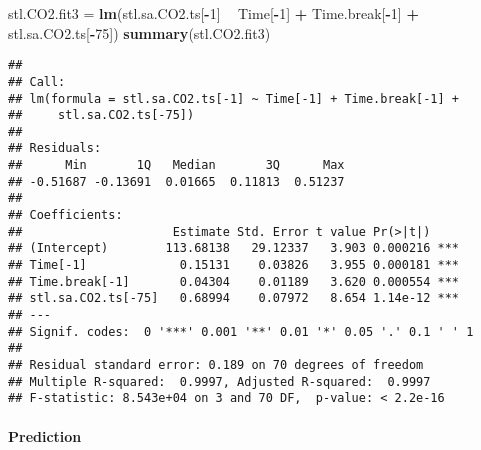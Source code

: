 \documentclass[]{article}
\newenvironment{Shaded}{\begin{snugshade}}{\end{snugshade}}
\newcommand{\DecValTok}[1]{\textcolor[rgb]{0.00,0.00,0.81}{#1}}
\newcommand{\KeywordTok}[1]{\textcolor[rgb]{0.13,0.29,0.53}{\textbf{#1}}}
\newcommand{\NormalTok}[1]{#1}
\newcommand{\OperatorTok}[1]{\textcolor[rgb]{0.81,0.36,0.00}{\textbf{#1}}}
\newcommand{\StringTok}[1]{\textcolor[rgb]{0.31,0.60,0.02}{#1}}
\let\oldparagraph\paragraph
\renewcommand{\paragraph}[1]{\oldparagraph{#1}\mbox{}}
\begin{document}
\begin{Shaded}
\begin{Highlighting}[]
\NormalTok{stl.CO2.fit3 =}\StringTok{ }\KeywordTok{lm}\NormalTok{(stl.sa.CO2.ts[}\OperatorTok{-}\DecValTok{1}\NormalTok{] }\OperatorTok{~}\StringTok{ }\NormalTok{Time[}\OperatorTok{-}\DecValTok{1}\NormalTok{] }\OperatorTok{+}\StringTok{ }\NormalTok{Time.break[}\OperatorTok{-}\DecValTok{1}\NormalTok{] }\OperatorTok{+}\StringTok{ }\NormalTok{stl.sa.CO2.ts[}\OperatorTok{-}\DecValTok{75}\NormalTok{])}
\KeywordTok{summary}\NormalTok{(stl.CO2.fit3)}
\end{Highlighting}
\end{Shaded}

\begin{verbatim}
## 
## Call:
## lm(formula = stl.sa.CO2.ts[-1] ~ Time[-1] + Time.break[-1] + 
##     stl.sa.CO2.ts[-75])
## 
## Residuals:
##      Min       1Q   Median       3Q      Max 
## -0.51687 -0.13691  0.01665  0.11813  0.51237 
## 
## Coefficients:
##                     Estimate Std. Error t value Pr(>|t|)    
## (Intercept)        113.68138   29.12337   3.903 0.000216 ***
## Time[-1]             0.15131    0.03826   3.955 0.000181 ***
## Time.break[-1]       0.04304    0.01189   3.620 0.000554 ***
## stl.sa.CO2.ts[-75]   0.68994    0.07972   8.654 1.14e-12 ***
## ---
## Signif. codes:  0 '***' 0.001 '**' 0.01 '*' 0.05 '.' 0.1 ' ' 1
## 
## Residual standard error: 0.189 on 70 degrees of freedom
## Multiple R-squared:  0.9997, Adjusted R-squared:  0.9997 
## F-statistic: 8.543e+04 on 3 and 70 DF,  p-value: < 2.2e-16
\end{verbatim}

\hypertarget{prediction-1}{%
\paragraph{Prediction}\label{prediction-1}}
\end{document}
